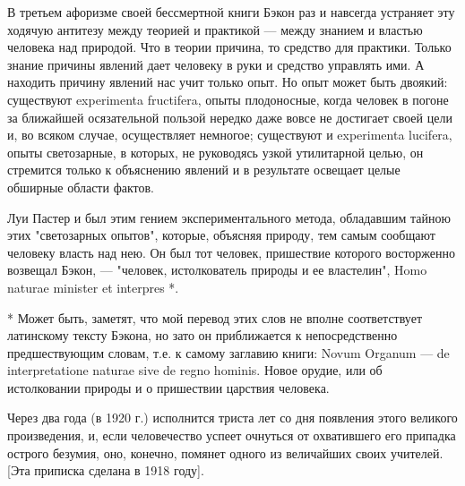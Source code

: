 В  третьем  афоризме своей  бессмертной  книги  Бэкон раз  и  навсегда
устраняет эту  ходячую антитезу  между теорией  и практикой  --- между
знанием  и властью  человека над  природой. Что  в теории  причина, то
средство  для практики.  Только знание  причины явлений  дает человеку
в  руки  и   средство  управлять  ими.  А   находить  причину  явлений
нас  учит  только  опыт.  Но   опыт  может  быть  двоякий:  существуют
experimenta  fructifera, опыты  плодоносные,  когда  человек в  погоне
за  ближайшей осязательной  пользой  нередко даже  вовсе не  достигает
своей цели  и, во всяком  случае, осуществляет немногое;  существуют и
experimenta  lucifera, опыты  светозарные,  в  которых, не  руководясь
узкой утилитарной целью, он стремится  только к объяснению явлений и в
результате освещает целые обширные области фактов.

Луи  Пастер и  был этим  гением экспериментального  метода, обладавшим
тайною этих "светозарных опытов", которые, объясняя природу, тем самым
сообщают  человеку власть  над  нею. Он  был  тот человек,  пришествие
которого  восторженно  возвещал  Бэкон,  ---  "человек,  истолкователь
природы и ее властелин", Homo naturae minister et interpres *.

*  Может  быть,   заметят,  что  мой  перевод  этих   слов  не  вполне
соответствует  латинскому тексту  Бэкона,  но зато  он приближается  к
непосредственно предшествующим  словам, т.е. к самому  заглавию книги:
Novum Organum  --- de interpretatione  naturae sive de  regno hominis.
Новое  орудие, или  об истолковании  природы и  о пришествии  царствия
человека.

Через два  года (в  1920 г.)  исполнится триста  лет со  дня появления
этого великого  произведения, и, если человечество  успеет очнуться от
охватившего его припадка острого безумия, оно, конечно, помянет одного
из величайших своих учителей. [Эта приписка сделана в 1918 году].
